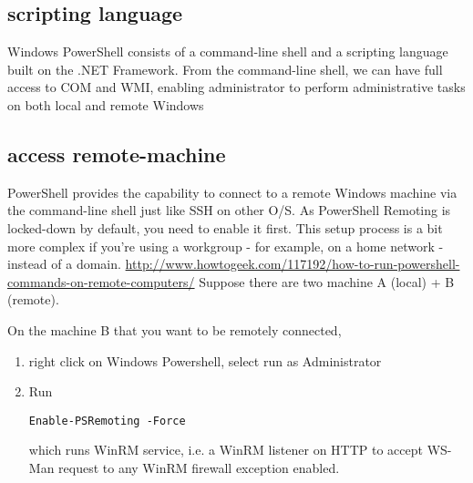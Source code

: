 \subsection{scripting language}
\label{sec:scripting_language_PowerShell}

Windows PowerShell consists of a command-line shell and a scripting language built on the .NET Framework.
From the command-line shell, we can have full access to COM and WMI, enabling administrator to perform administrative
tasks on both local and remote Windows

\subsection{access remote-machine}

PowerShell provides the capability to connect to a remote Windows machine via
the command-line shell just like SSH on other O/S.
As PowerShell Remoting is locked-down by default, you need to enable it first.
This setup process is a bit more complex if you're using a workgroup - for example, on a home network - instead of a domain.
\url{http://www.howtogeek.com/117192/how-to-run-powershell-commands-on-remote-computers/}
Suppose there are two machine A (local) + B (remote).

On the machine B that you want to be remotely connected, 
\begin{enumerate}
  \item right click on Windows Powershell, select run as Administrator
  
  \item Run
\begin{verbatim}
Enable-PSRemoting -Force
\end{verbatim}
which runs WinRM service, i.e. a WinRM listener on HTTP to accept WS-Man request to any WinRM firewall exception enabled.
\end{enumerate}

